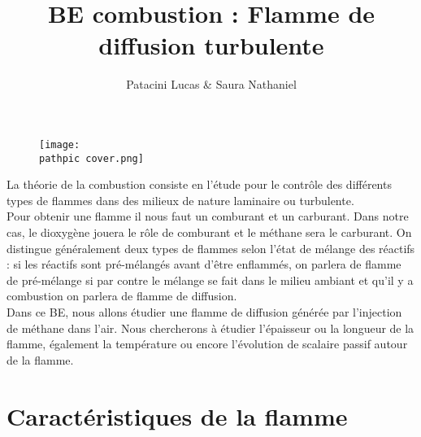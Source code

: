 \documentclass[a4paper,10pt]{article}
\title{ \dblue BE combustion : Flamme de diffusion turbulente }
\author{ \darker Patacini Lucas \& Saura Nathaniel}
\newcommand\pathpic{/home/nsaura/Documents/new_doc/Latex_files/Pic/BE_combustion/}
\begin{document}
\maketitle 
\vspace{-1cm}
\begin{figure}[ht!]
\centering
\texttt{[image: \\pathpic cover.png]}
\end{figure}

\noindent La théorie de la combustion consiste en l’étude pour le contrôle des différents types de flammes dans des milieux de nature laminaire ou turbulente. \\
Pour obtenir une flamme il nous faut un comburant et un carburant. Dans notre cas, le dioxygène jouera le rôle de comburant et le méthane sera le carburant.
On distingue généralement deux types de flammes selon l’état de mélange des réactifs : si les réactifs sont pré-mélangés  avant d’être enflammés, on parlera de flamme de pré-mélange si par contre le mélange se fait dans le milieu ambiant et qu’il y a combustion on parlera de flamme de diffusion.\\

\noindent Dans ce BE, nous allons étudier une flamme de diffusion générée par l’injection de méthane dans l’air. Nous chercherons à étudier l’épaisseur ou la longueur de la flamme, également la température ou encore l’évolution de scalaire passif autour de la flamme. 

\section{Caractéristiques de la flamme}
\end{document}
